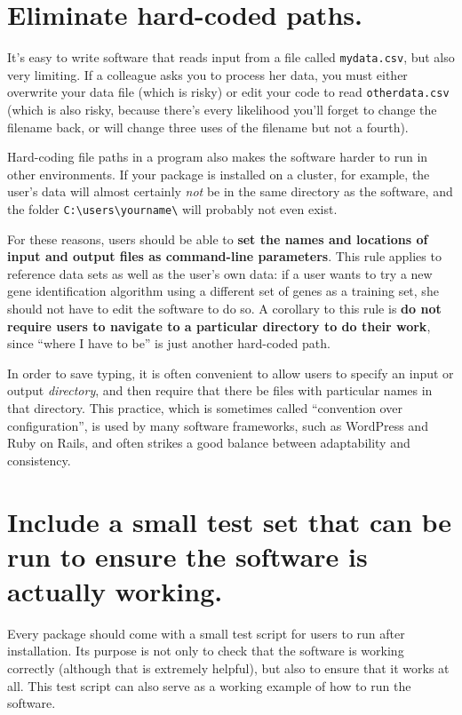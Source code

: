 \documentclass[10pt,letterpaper]{article}
\begin{document}
\section{Eliminate hard-coded paths.}

It's easy to write software that reads input from a file called
\texttt{mydata.csv}, but also very limiting. If a colleague asks you to
process her data, you must either overwrite your data file (which is
risky) or edit your code to read \texttt{otherdata.csv} (which is also
risky, because there's every likelihood you'll forget to change the
filename back, or will change three uses of the filename but not a
fourth).

Hard-coding file paths in a program also makes the software harder to run
in other environments. If your package is installed on a cluster, for
example, the user's data will almost certainly \emph{not} be in the same
directory as the software, and the folder
\texttt{C:\textbackslash{}users\textbackslash{}yourname\textbackslash{}}
will probably not even exist.

For these reasons, users should be able to
\textbf{set the names and locations of input and output files as command-line parameters}.
This rule applies to reference data sets as well as the user's own
data: if a user wants to try a new gene identification algorithm using
a different set of genes as a training set, she should not have to
edit the software to do so.
A corollary to this rule is
\textbf{do not require users to navigate to a particular directory to do their work},
since ``where I have to be'' is just another hard-coded path.

In order to save typing, it is often convenient to allow users to
specify an input or output \emph{directory}, and then require that there
be files with particular names in that directory. This practice, which
is sometimes called ``convention over configuration'', is used by many
software frameworks, such as WordPress and Ruby on Rails, and often
strikes a good balance between adaptability and consistency.

\section{Include a small test set that can be run to ensure the software is actually working.}

Every package should come with a small test script for users to run
after installation. Its purpose is not only to check that the software
is working correctly (although that is extremely helpful), but also to
ensure that it works at all. This test script can also serve as a
working example of how to run the software.
\end{document}
